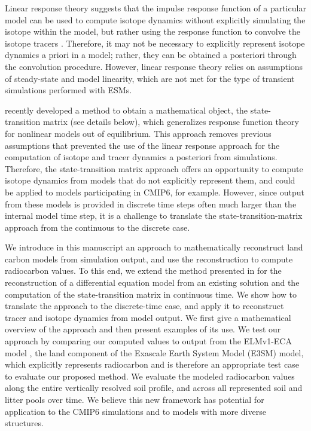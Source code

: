 \documentclass[draft]{agujournal2019}
\begin{document}
Linear response theory suggests that the impulse response function of a particular model can be used to compute isotope dynamics without explicitly simulating the isotope within the model, but rather using the response function to convolve the isotope tracers \cite{Thompson1999}. Therefore, it may not be necessary to explicitly represent isotope dynamics a priori in a model; rather, they can be obtained a posteriori through the convolution procedure. However, linear response theory relies on assumptions of steady-state and model linearity, which are not met for the type of transient simulations performed with ESMs. 

 recently developed a method to obtain a mathematical object, the state-transition matrix (see details below), which generalizes response function theory for nonlinear models out of equilibrium. This approach removes previous assumptions that prevented the use of the linear response approach for the computation of isotope and tracer dynamics a posteriori from simulations. Therefore, the state-transition matrix approach offers an opportunity to compute isotope dynamics from models that do not explicitly represent them, and could be applied to models participating in CMIP6, for example. However, since output from these models is provided in discrete time steps often much larger than the internal model time step, it is a challenge to translate the state-transition-matrix approach from the continuous to the discrete case.

We introduce in this manuscript an approach to mathematically reconstruct land carbon models from simulation output, and use the reconstruction to compute radiocarbon values. To this end, we extend the method presented in  for the reconstruction of a differential equation model from an existing solution and the computation of the state-transition matrix in continuous time. We show how to translate the approach to the discrete-time case, and apply it to reconstruct tracer and isotope dynamics from model output. We first give a mathematical overview of the approach and then present examples of its use. We test our approach by comparing our computed values to output from the ELMv1-ECA model \cite{Zhu2019, Riley2018,Chen2009JGR, Tang2018EI}, the land component of the Exascale Earth System Model (E3SM) model, which explicitly represents radiocarbon and is therefore an appropriate test case to evaluate our proposed method. We evaluate the modeled radiocarbon values along the entire vertically resolved soil profile, and across all represented soil and litter pools over time. We believe this new framework has  potential for application to the CMIP6 simulations and to models with more diverse structures.
\end{document}

